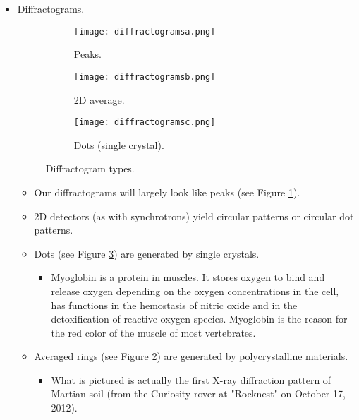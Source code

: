 \documentclass[../notes.tex]{subfiles}
\begin{document}
\begin{itemize}
    \item Diffractograms.
    \begin{figure}[H]
        \centering
        \begin{subfigure}[b]{0.33\linewidth}
            \centering
            \texttt{[image: diffractogramsa.png]}
            \caption{Peaks.}
            \label{fig:diffractogramsa}
        \end{subfigure}
        \begin{subfigure}[b]{0.32\linewidth}
            \centering
            \texttt{[image: diffractogramsb.png]}
            \caption{2D average.}
            \label{fig:diffractogramsb}
        \end{subfigure}
        \begin{subfigure}[b]{0.33\linewidth}
            \centering
            \texttt{[image: diffractogramsc.png]}
            \caption{Dots (single crystal).}
            \label{fig:diffractogramsc}
        \end{subfigure}
        \caption{Diffractogram types.}
        \label{fig:diffractograms}
    \end{figure}
    \begin{itemize}
        \item Our diffractograms will largely look like peaks (see Figure \ref{fig:diffractogramsa}).
        \item 2D detectors (as with synchrotrons) yield circular patterns or circular dot patterns.
        \item Dots (see Figure \ref{fig:diffractogramsc}) are generated by single crystals.
        \begin{itemize}
            \item Myoglobin is a protein in muscles. It stores oxygen to bind and release oxygen depending on the oxygen concentrations in the cell, has functions in the hemostasis of nitric oxide and in the detoxification of reactive oxygen species. Myoglobin is the reason for the red color of the muscle of most vertebrates.
        \end{itemize}
        \item Averaged rings (see Figure \ref{fig:diffractogramsb}) are generated by polycrystalline materials.
        \begin{itemize}
            \item What is pictured is actually the first X-ray diffraction pattern of Martian soil (from the Curiosity rover at "Rocknest" on October 17, 2012).

\end{itemize}
\end{itemize}
\end{itemize}
\end{document}
